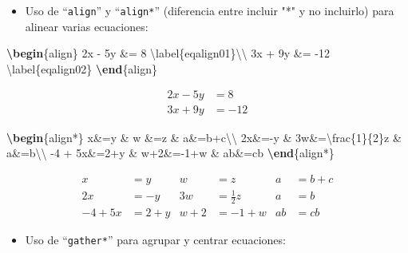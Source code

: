 \documentclass[12pt,a4paper,]{book}
\newenvironment{Shaded}{\begin{snugshade}}{\end{snugshade}}
\newcommand{\ExtensionTok}[1]{#1}
\newcommand{\KeywordTok}[1]{\textcolor[rgb]{0.13,0.29,0.53}{\textbf{#1}}}
\newcommand{\NormalTok}[1]{#1}
\newcommand{\SpecialCharTok}[1]{\textcolor[rgb]{0.00,0.00,0.00}{#1}}
\newcommand{\SpecialStringTok}[1]{\textcolor[rgb]{0.31,0.60,0.02}{#1}}
\providecommand{\tightlist}{%
  \setlength{\itemsep}{0pt}\setlength{\parskip}{0pt}}
\numberwithin{dummy}{section}
\theoremstyle{ocrenumbox}
\theoremstyle{blacknumex}
\theoremstyle{blacknumbox}
\theoremstyle{ocrenum}
\theoremstyle{ocrenum}
\begin{document}
\begin{itemize}
\tightlist
\item
  Uso de ``\texttt{align}'' y ``\texttt{align*}'' (diferencia entre
  incluir "*" y no incluirlo) para alinear varias ecuaciones:
\end{itemize}

\begin{Shaded}
\begin{Highlighting}[]
\KeywordTok{\textbackslash{}begin}\NormalTok{\{}\ExtensionTok{align}\NormalTok{\}}\SpecialStringTok{ }
\SpecialStringTok{2x {-} 5y \&=  8  }\SpecialCharTok{\textbackslash{}label}\SpecialStringTok{\{eqalign01\}}\SpecialCharTok{\textbackslash{}\textbackslash{}}\SpecialStringTok{ }
\SpecialStringTok{3x + 9y \&=  {-}12 }\SpecialCharTok{\textbackslash{}label}\SpecialStringTok{\{eqalign02\}}
\KeywordTok{\textbackslash{}end}\NormalTok{\{}\ExtensionTok{align}\NormalTok{\}}
\end{Highlighting}
\end{Shaded}

\begin{align} 
2x - 5y &=  8  \label{eqalign01}\\ 
3x + 9y &=  -12 \label{eqalign02}
\end{align}

\begin{Shaded}
\begin{Highlighting}[]
\KeywordTok{\textbackslash{}begin}\NormalTok{\{}\ExtensionTok{align*}\NormalTok{\}}
\SpecialStringTok{x\&=y           \&  w \&=z              \&  a\&=b+c}\SpecialCharTok{\textbackslash{}\textbackslash{}}
\SpecialStringTok{2x\&={-}y         \&  3w\&=}\SpecialCharTok{\textbackslash{}frac}\SpecialStringTok{\{1\}\{2\}z   \&  a\&=b}\SpecialCharTok{\textbackslash{}\textbackslash{}}
\SpecialStringTok{{-}4 + 5x\&=2+y   \&  w+2\&={-}1+w          \&  ab\&=cb}
\KeywordTok{\textbackslash{}end}\NormalTok{\{}\ExtensionTok{align*}\NormalTok{\}}
\end{Highlighting}
\end{Shaded}

\begin{align*}
x&=y           &  w &=z              &  a&=b+c\\
2x&=-y         &  3w&=\frac{1}{2}z   &  a&=b\\
-4 + 5x&=2+y   &  w+2&=-1+w          &  ab&=cb
\end{align*}

\begin{itemize}
\tightlist
\item
  Uso de ``\texttt{gather*}'' para agrupar y centrar ecuaciones:
\end{itemize}
\end{document}
